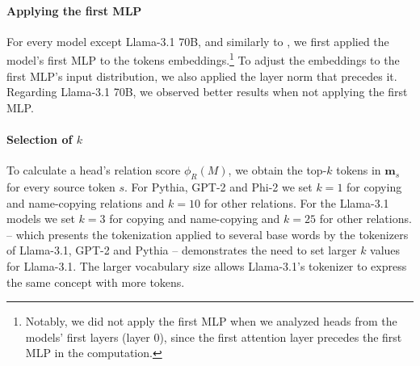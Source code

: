 \documentclass[11pt]{article}
\newcommand{\llamaThreeSeventyB}{Llama-3.1 70B}
\newcommand{\llama}{Llama-3.1}
\newcommand{\PHI}{Phi-2}
\newcommand{\Pythia}{Pythia}
\newcommand{\GPT}{GPT-2}
\begin{document}
\paragraph{Applying the first MLP}
 For every model except \llamaThreeSeventyB, and similarly to \citet{wang2022interpretability, gould2024successor}, we first applied the model's first MLP to the tokens embeddings.\footnote{Notably, we did not apply the first MLP when we analyzed heads from the models' first layers (layer 0), since the first attention layer precedes the first MLP in the computation.}
 To adjust the embeddings to the first MLP's input distribution, we also applied the layer norm that precedes it. Regarding \llamaThreeSeventyB{}, we observed better results when not applying the first MLP.
 
\paragraph{Selection of $k$}
To calculate a head's relation score $\phi_R(M)$, we obtain the top-$k$ tokens in $\mathbf{m}_s$ for every source token $s$. For \Pythia{}, \GPT{} and \PHI{} we set $k=1$ for copying and name-copying relations and $k=10$ for other relations. For the \llama{} models we set $k=3$ for copying and name-copying and $k=25$ for other relations.  -- which presents the tokenization applied to several base words by the tokenizers of \llama{}, \GPT{} and \Pythia{} -- demonstrates the need to set larger $k$ values for \llama{}. The larger vocabulary size allows \llama{}'s tokenizer to express the same concept with more tokens.
\end{document}
